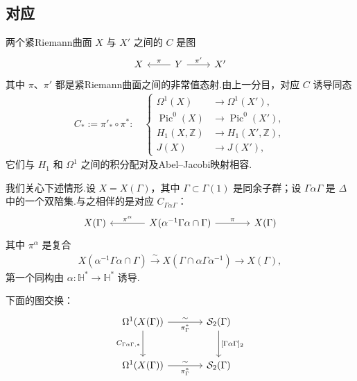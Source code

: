 \subsection{对应}\label{sec:modular-2-2-3}

两个紧Riemann曲面 $X$ 与 $X'$ 之间的 $C$ 是图
\[
\begin{tikzcd}
X & Y \arrow[l,"\pi"'] \arrow[r,"\pi'"] & X'
\end{tikzcd}
\]
其中 $\pi$、$\pi'$ 都是紧Riemann曲面之间的非常值态射.由上一分目，对应 $C$ 诱导同态
\begin{align*}
C_*:=\pi'_*\circ\pi^*:\quad
\left\{\begin{aligned}
\Omega^1(X)&\longrightarrow\Omega^1(X'),\\
\operatorname{Pic}^0(X)&\longrightarrow\operatorname{Pic}^0(X'),\\
H_1(X,\mathbb Z)&\longrightarrow H_1(X',\mathbb Z),\\
J(X)&\longrightarrow J(X'),
\end{aligned}\right.
\end{align*}
它们与 $H_1$ 和 $\Omega^1$ 之间的积分配对及Abel--Jacobi映射相容.



我们关心下述情形.设 $X=X(\Gamma)$，其中 $\Gamma\subset\Gamma(1)$ 是同余子群；设 $\Gamma\alpha\Gamma$ 是 $\Delta$ 中的一个双陪集.与之相伴的是对应 $C_{\Gamma\alpha\Gamma}$：
\[
\begin{tikzcd}[column sep=large]
X(\Gamma) & X(\alpha^{-1}\Gamma\alpha\cap\Gamma) \arrow[l,"\pi^\alpha"'] \arrow[r,"\pi"] & X(\Gamma)
\end{tikzcd}
\]
其中 $\pi^\alpha$ 是复合
\begin{align*}
X(\alpha^{-1}\Gamma\alpha\cap\Gamma)\xrightarrow{\sim}X(\Gamma\cap\alpha\Gamma\alpha^{-1})\longrightarrow X(\Gamma),
\end{align*}
第一个同构由 $\alpha:\mathbb H^*\longrightarrow\mathbb H^*$ 诱导.

\begin{lemma*}

下面的图交换：
\[
\begin{tikzcd}[column sep=large,row sep=large]
\Omega^1(X(\Gamma)) \arrow[r,"\sim","\pi_\Gamma^*"'] \arrow[d,"C_{\Gamma\alpha\Gamma,*}"'] & \mathcal S_2(\Gamma) \arrow[d,"{[\Gamma\alpha\Gamma]_2}"] \\
\Omega^1(X(\Gamma)) \arrow[r,"\sim","\pi_\Gamma^*"'] & \mathcal S_2(\Gamma)
\end{tikzcd}
\]
\end{lemma*}

